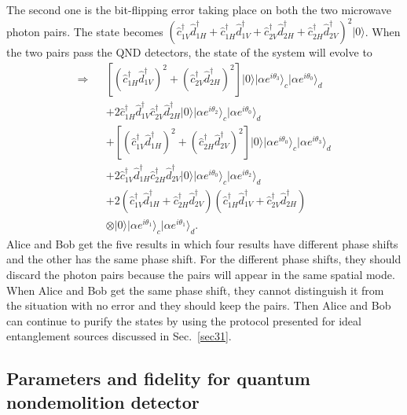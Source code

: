 \documentclass[showpacs,aps,graphicx,twocolumn]{revtex4}
\begin{document}
The second one is the bit-flipping error taking place on both the
two microwave photon pairs. The state becomes
$(\hat{c}_{1V}^{\dag}\hat{d}_{1H}^{\dag}+\hat{c}_{1H}^{\dag}\hat{d}_{1V}^{\dag}
+\hat{c}_{2V}^{\dag}\hat{d}_{2H}^{\dag}+\hat{c}_{2H}^{\dag}\hat{d}_{2V}^{\dag})^{2}|0\rangle$.
When the two pairs pass the QND detectors, the state of the system will evolve to
\begin{eqnarray}   \label{eq19}
\Longrightarrow\!\!\!\!&&[(\hat{c}_{1H}^{\dag}\hat{d}_{1V}^{\dag})^{2}
+(\hat{c}_{2V}^{\dag}\hat{d}_{2H}^{\dag})^{2}]|0\rangle
|\alpha e^{i\theta_{3}}\rangle_{c}|\alpha e^{i\theta_{0}}\rangle_{d}\nonumber\\
&&+2\hat{c}_{1H}^{\dag}\hat{d}_{1V}^{\dag}\hat{c}_{2V}^{\dag}\hat{d}_{2H}^{\dag}|0\rangle
|\alpha e^{i\theta_{2}}\rangle_{c}|\alpha e^{i\theta_{0}}\rangle_{d}\nonumber\\
&&+[(\hat{c}_{1V}^{\dag}\hat{d}_{1H}^{\dag})^{2}+(\hat{c}_{2H}^{\dag}\hat{d}_{2V}^{\dag})^{2}]
|0\rangle|\alpha e^{i\theta_{0}}\rangle_{c}|\alpha e^{i\theta_{3}}\rangle_{d}\nonumber\\
&&+2\hat{c}_{1V}^{\dag}\hat{d}_{1H}^{\dag}\hat{c}_{2H}^{\dag}\hat{d}_{2V}^{\dag}
|0\rangle|\alpha e^{i\theta_{0}}\rangle_{c}|\alpha e^{i\theta_{2}}\rangle_{d}\nonumber\\
&&+2(\hat{c}_{1V}^{\dag}\hat{d}_{1H}^{\dag}+\hat{c}_{2H}^{\dag}\hat{d}_{2V}^{\dag})
(\hat{c}_{1H}^{\dag}\hat{d}_{1V}^{\dag}+\hat{c}_{2V}^{\dag}\hat{d}_{2H}^{\dag})\;\;\;\;\;\;\;\;\nonumber\\
&&\otimes|0\rangle|\alpha e^{i\theta_{1}}\rangle_{c}|\alpha
e^{i\theta_{1}}\rangle_{d}.
\end{eqnarray}
Alice and Bob get the five results in which four results have
different phase shifts and the other has the same phase shift. For
the different phase shifts, they should discard the photon pairs because
the pairs will appear in the same spatial mode. When Alice and Bob
get the same phase shift, they cannot distinguish it from the situation
with no error and they should keep the pairs. Then Alice and Bob can
continue to purify the states by using the protocol presented for
ideal entanglement sources discussed in Sec.~\ref{sec31}.






\subsection{Parameters and fidelity for quantum nondemolition detector}
\label{sec33}
\end{document}
